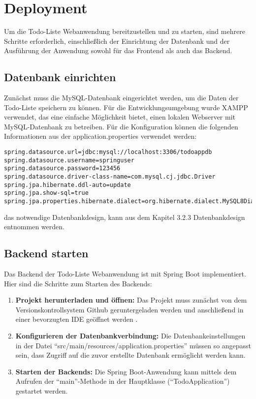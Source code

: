 \chapter{Deployment}

Um die Todo-Liste Webanwendung bereitzustellen und zu starten, sind mehrere Schritte erforderlich, einschließlich der Einrichtung der Datenbank und der Ausführung der Anwendung sowohl für das Frontend als auch das Backend.

\section{Datenbank einrichten}

Zunächst muss die MySQL-Datenbank eingerichtet werden, um die Daten der Todo-Liste speichern zu können. Für die Entwicklungsumgebung wurde XAMPP verwendet, das eine einfache Möglichkeit bietet, einen lokalen Webserver mit MySQL-Datenbank zu betreiben. Für die Konfiguration können die folgenden Informationen aus der application.properties verwendet werden:

\begin{lstlisting}
spring.datasource.url=jdbc:mysql://localhost:3306/todoappdb
spring.datasource.username=springuser
spring.datasource.password=123456
spring.datasource.driver-class-name=com.mysql.cj.jdbc.Driver
spring.jpa.hibernate.ddl-auto=update
spring.jpa.show-sql=true
spring.jpa.properties.hibernate.dialect=org.hibernate.dialect.MySQL8Dialect
\end{lstlisting}

das notwendige Datenbankdesign, kann aus dem Kapitel 3.2.3 Datenbankdesign entnommen werden.


\section{Backend starten}
Das Backend der Todo-Liste Webanwendung ist mit Spring Boot implementiert. Hier sind die Schritte zum Starten des Backends:

\begin{enumerate}
	\item \textbf{Projekt herunterladen und öffnen:} Das Projekt muss zunächst von dem Versionskontrollsystem Github geruntergeladen werden und anschließend in einer bevorzugten IDE geöffnet werden \cite{noauthor_philippabeletdd--java_nodate}. 	%
	\item \textbf{Konfigurieren der Datenbankverbindung:} Die Datenbankeinstellungen in der Datei "`src/main/resources/application.properties"' müssen so angepasst sein, dass Zugriff auf die zuvor erstellte Datenbank ermöglicht werden kann.
	\item \textbf{Starten der Backends:} Die Spring Boot-Anwendung kann mittels dem Aufrufen der "`main"'-Methode in der Hauptklasse ("`TodoApplication"') gestartet werden.
\end{enumerate}

